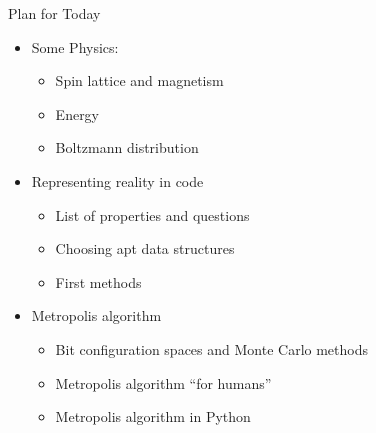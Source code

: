 \begin{frame}[fragile]{Plan for Today}
%
\begin{itemize}
\item Some Physics: 
	\begin{itemize}
	\item Spin lattice and magnetism
	\item Energy
	\item Boltzmann distribution
	\end{itemize}
\item Representing reality in code
	\begin{itemize}
	\item List of properties and questions
	\item Choosing apt data structures
	\item First methods
	\end{itemize}
\item Metropolis algorithm
	\begin{itemize}
	\item Bit configuration spaces and Monte Carlo methods
	\item Metropolis algorithm \enquote{for humans}
	\item Metropolis algorithm in Python
	\end{itemize}
\end{itemize}
%
\end{frame}


